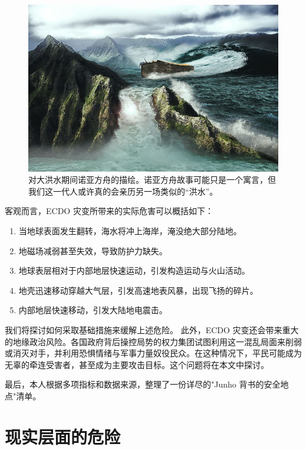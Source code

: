 \documentclass[10pt,twocolumn,letterpaper]{article}
\begin{document}
\begin{figure}[b]
\begin{center}
   \includegraphics[width=1\linewidth]{noah.jpg}
\end{center}
   \caption{对大洪水期间诺亚方舟的描绘。诺亚方舟故事可能只是一个寓言，但我们这一代人或许真的会亲历另一场类似的“洪水”。 \cite{2}}
\label{fig:1}
\label{fig:onecol}
\end{figure}

客观而言，ECDO 灾变所带来的实际危害可以概括如下：

\begin{flushleft}
\begin{enumerate}
    \item 当地球表面发生翻转，海水将冲上海岸，淹没绝大部分陆地。
    \item 地磁场减弱甚至失效，导致防护力缺失。
    \item 地球表层相对于内部地层快速运动，引发构造运动与火山活动。
    \item 地壳迅速移动穿越大气层，引发高速地表风暴，出现飞扬的碎片。
    \item 内部地层快速移动，引发大陆地电震击。
\end{enumerate}
\end{flushleft}

我们将探讨如何采取基础措施来缓解上述危险。
此外，ECDO 灾变还会带来重大的地缘政治风险。各国政府背后操控局势的权力集团试图利用这一混乱局面来削弱或消灭对手，并利用恐惧情绪与军事力量奴役民众。在这种情况下，平民可能成为无辜的牵连受害者，甚至成为主要攻击目标。这个问题将在本文中探讨。

最后，本人根据多项指标和数据来源，整理了一份详尽的"Junho 背书的安全地点"清单。
\section{现实层面的危险}
\end{document}

